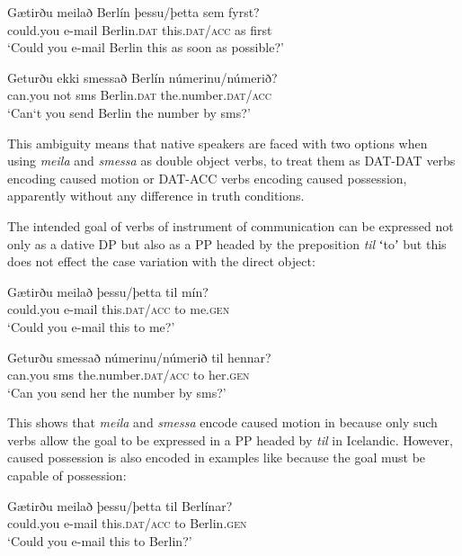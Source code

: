 \documentclass[output=paper,modfonts,nonflat,colorlinks,citecolor=brown]{langsci/langscibook}
\begin{document}
{ 
\ea%
    \label{ex:jonsson:11} 
\ea
\gll  *Gætirðu  meilað  Berlín  þessu/þetta  sem  fyrst?\\
   could.you  e-mail  Berlin.\textsc{dat}  this.\textsc{dat/acc}  as  first\\
\glt `Could you e-mail Berlin this as soon as possible?' 

\ex
\gll   *Geturðu  ekki  smessað  Berlín  númerinu/númerið?\\
 can.you  not  sms  Berlin.\textsc{dat}  the.number.\textsc{dat/acc}\\
\glt `Can‘t you send Berlin the number by sms?'
\z
\z

This ambiguity means that native speakers are faced with two options when using \textit{meila} and \textit{smessa} as double object verbs, to treat them as DAT-DAT verbs encoding caused motion or DAT-ACC verbs encoding caused possession, apparently without any difference in truth conditions. 

The intended goal of verbs of instrument of communication can be expressed not only as a dative DP but also as a PP headed by the preposition \textit{til} ʻtoʼ \citep[128-132]{Barðdal2008} but this does not effect the case variation with the direct object:

 
\ea%
    \label{ex:jonsson:12}  
\ea
\gll  Gætirðu  meilað  þessu/þetta  til  mín?\\
   could.you  e-mail  this.\textsc{dat/acc}  to  me.\textsc{gen}\\
\glt `Could you e-mail this to me?' 

\ex
\gll   Geturðu  smessað  númerinu/númerið  til  hennar?\\
 can.you  sms  the.number.\textsc{dat/acc}  to  her.\textsc{gen}\\
\glt `Can you send her the number by sms?'
\z
\z

This shows that \textit{meila} and \textit{smessa} encode caused motion in  because only such verbs allow the goal to be expressed in a PP headed by \textit{til} in Icelandic. However, caused possession is also encoded in examples like  because the goal must be capable of possession:

 
\ea%
    \label{ex:jonsson:13}  
\ea
\gll  *Gætirðu  meilað  þessu/þetta  til  Berlínar?\\
   could.you  e-mail  this.\textsc{dat/acc}  to  Berlin.\textsc{gen}\\
\glt `Could you e-mail this to Berlin?' 

}
\end{document}
